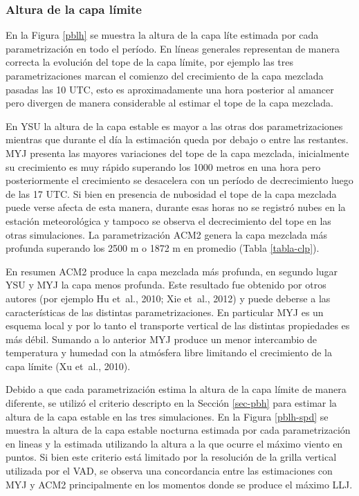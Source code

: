 \documentclass[12pt,spanish,oneside, a4paper]{book}
\begin{document}
\subsubsection{Altura de la capa
límite}\label{altura-de-la-capa-limite-1}

En la Figura \ref{pblh} se muestra la altura de la capa líte estimada
por cada parametrización en todo el período. En líneas generales
representan de manera correcta la evolución del tope de la capa límite,
por ejemplo las tres parametrizaciones marcan el comienzo del
crecimiento de la capa mezclada pasadas las 10 UTC, esto es
aproximadamente una hora posterior al amancer pero divergen de manera
considerable al estimar el tope de la capa mezclada.

En YSU la altura de la capa estable es mayor a las otras dos
parametrizaciones mientras que durante el día la estimación queda por
debajo o entre las restantes. MYJ presenta las mayores variaciones del
tope de la capa mezclada, inicialmente su crecimiento es muy rápido
superando los 1000 metros en una hora pero posteriormente el crecimiento
se desacelera con un período de decrecimiento luego de las 17 UTC. Si
bien en presencia de nubosidad el tope de la capa mezclada puede verse
afecta de esta manera, durante esas horas no se registró nubes en la
estación meteorológica y tampoco se observa el decrecimiento del tope en
las otras simulaciones. La parametrización ACM2 genera la capa mezclada
más profunda superando los 2500 m o 1872 m en promedio (Tabla
\ref{tabla-clp}).

En resumen ACM2 produce la capa mezclada más profunda, en segundo lugar
YSU y MYJ la capa menos profunda. Este resultado fue obtenido por otros
autores (por ejemplo Hu et~al., 2010; Xie et~al., 2012) y puede deberse
a las características de las distintas parametrizaciones. En particular
MYJ es un esquema local y por lo tanto el transporte vertical de las
distintas propiedades es más débil. Sumando a lo anterior MYJ produce un
menor intercambio de temperatura y humedad con la atmósfera libre
limitando el crecimiento de la capa límite (Xu et~al., 2010).

Debido a que cada parametrización estima la altura de la capa límite de
manera diferente, se utilizó el criterio descripto en la Sección
\ref{sec-pbh} para estimar la altura de la capa estable en las tres
simulaciones. En la Figura \ref{pblh-spd} se muestra la altura de la
capa estable nocturna estimada por cada parametrización en lineas y la
estimada utilizando la altura a la que ocurre el máximo viento en
puntos. Si bien este criterio está limitado por la resolución de la
grilla vertical utilizada por el VAD, se observa una concordancia entre
las estimaciones con MYJ y ACM2 principalmente en los momentos donde se
produce el máximo LLJ.
\end{document}
